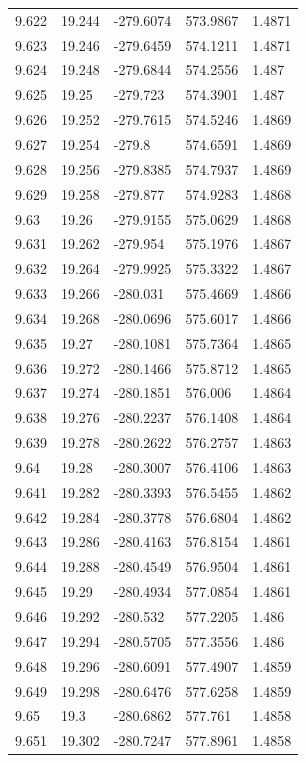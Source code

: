 \begin{tabular}{lllll}
9.622 & 19.244 & -279.6074 & 573.9867 & 1.4871 \\
9.623 & 19.246 & -279.6459 & 574.1211 & 1.4871 \\
9.624 & 19.248 & -279.6844 & 574.2556 & 1.487 \\
9.625 & 19.25 & -279.723 & 574.3901 & 1.487 \\
9.626 & 19.252 & -279.7615 & 574.5246 & 1.4869 \\
9.627 & 19.254 & -279.8 & 574.6591 & 1.4869 \\
9.628 & 19.256 & -279.8385 & 574.7937 & 1.4869 \\
9.629 & 19.258 & -279.877 & 574.9283 & 1.4868 \\
9.63 & 19.26 & -279.9155 & 575.0629 & 1.4868 \\
9.631 & 19.262 & -279.954 & 575.1976 & 1.4867 \\
9.632 & 19.264 & -279.9925 & 575.3322 & 1.4867 \\
9.633 & 19.266 & -280.031 & 575.4669 & 1.4866 \\
9.634 & 19.268 & -280.0696 & 575.6017 & 1.4866 \\
9.635 & 19.27 & -280.1081 & 575.7364 & 1.4865 \\
9.636 & 19.272 & -280.1466 & 575.8712 & 1.4865 \\
9.637 & 19.274 & -280.1851 & 576.006 & 1.4864 \\
9.638 & 19.276 & -280.2237 & 576.1408 & 1.4864 \\
9.639 & 19.278 & -280.2622 & 576.2757 & 1.4863 \\
9.64 & 19.28 & -280.3007 & 576.4106 & 1.4863 \\
9.641 & 19.282 & -280.3393 & 576.5455 & 1.4862 \\
9.642 & 19.284 & -280.3778 & 576.6804 & 1.4862 \\
9.643 & 19.286 & -280.4163 & 576.8154 & 1.4861 \\
9.644 & 19.288 & -280.4549 & 576.9504 & 1.4861 \\
9.645 & 19.29 & -280.4934 & 577.0854 & 1.4861 \\
9.646 & 19.292 & -280.532 & 577.2205 & 1.486 \\
9.647 & 19.294 & -280.5705 & 577.3556 & 1.486 \\
9.648 & 19.296 & -280.6091 & 577.4907 & 1.4859 \\
9.649 & 19.298 & -280.6476 & 577.6258 & 1.4859 \\
9.65 & 19.3 & -280.6862 & 577.761 & 1.4858 \\
9.651 & 19.302 & -280.7247 & 577.8961 & 1.4858 \\

\end{tabular}
